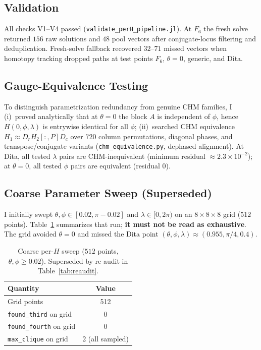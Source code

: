 \documentclass[onecolumn]{IEEEtran}
\begin{document}
\subsection{Validation}
All checks V1--V4 passed (\texttt{validate\_perH\_pipeline.jl}).
At $F_6$ the fresh solve returned $156$ raw solutions and $48$ pool vectors after conjugate-locus filtering and deduplication.
Fresh-solve fallback recovered $32$--$71$ missed vectors when homotopy tracking dropped paths at test points $F_6$, $\theta=0$, generic, and Dita.

\subsection{Gauge-Equivalence Testing}
To distinguish parametrization redundancy from genuine CHM families, I (i)~proved analytically that at $\theta=0$ the block $A$ is independent of $\phi$, hence $H(0,\phi,\lambda)$ is entrywise identical for all $\phi$; (ii)~searched CHM equivalence $H_1\approx D_r H_2[:,P] D_c$ over $720$ column permutations, diagonal phases, and transpose/conjugate variants (\texttt{chm\_equivalence.py}, dephased alignment).
At Dita, all tested $\lambda$ pairs are CHM-inequivalent (minimum residual $\approx2.3\times10^{-2}$); at $\theta=0$, all tested $\phi$ pairs are equivalent (residual $0$).

\subsection{Coarse Parameter Sweep (Superseded)}
I initially swept $\theta,\phi\in[0.02,\pi-0.02]$ and $\lambda\in[0,2\pi)$ on an $8\times8\times8$ grid ($512$ points).
Table~\ref{tab:sweep} summarizes that run; \textbf{it must not be read as exhaustive}.
The grid avoided $\theta=0$ and missed the Dita point $(\theta,\phi,\lambda)\approx(0.955,\pi/4,0.4)$.

\begin{table}[t]
\caption{Coarse per-$H$ sweep ($512$ points, $\theta,\phi\ge0.02$). Superseded by re-audit in Table~\ref{tab:reaudit}.}
\label{tab:sweep}
\centering
\begin{tabular}{@{}lc@{}}
\toprule
Quantity & Value \\
\midrule
Grid points & 512 \\
\texttt{found\_third} on grid & 0 \\
\texttt{found\_fourth} on grid & 0 \\
\texttt{max\_clique} on grid & 2 (all sampled) \\
\bottomrule
\end{tabular}
\end{table}
\end{document}
